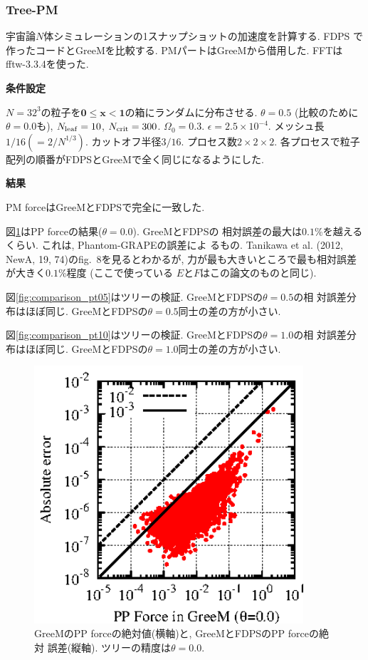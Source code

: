 \subsubsection{Tree-PM}

宇宙論$N$体シミュレーションの1スナップショットの加速度を計算する. FDPS
で作ったコードとGreeMを比較する. PMパートはGreeMから借用した. FFTは
fftw-3.3.4を使った.

{\bf 条件設定}

$N=32^3$の粒子を$\bm{0} \le \bm{x} < \bm{1}$の箱にランダムに分布させる.
$\theta=0.5$ (比較のために$\theta=0.0$も), $N_{\rm leaf}=10$, $N_{\rm
crit}=300$. $\Omega_0=0.3$. $\epsilon=2.5 \times 10^{-4}$. メッシュ長
$1/16(=2/N^{1/3})$. カットオフ半径$3/16$. プロセス数$2 \times 2 \times
2$. 各プロセスで粒子配列の順番がFDPSとGreeMで全く同じになるようにした.

{\bf 結果}

PM forceはGreeMとFDPSで完全に一致した.

図\ref{fig:comparison_pp}はPP forceの結果($\theta=0.0$). GreeMとFDPSの
相対誤差の最大は$0.1$\%を越えるくらい. これは, Phantom-GRAPEの誤差によ
るもの. Tanikawa et al. (2012, NewA, 19, 74)のfig.~8を見るとわかるが,
力が最も大きいところで最も相対誤差が大きく$0.1$\%程度 (ここで使っている
$E$と$F$はこの論文のものと同じ).

図\ref{fig:comparison_pt05}はツリーの検証. GreeMとFDPSの$\theta=0.5$の相
対誤差分布はほぼ同じ. GreeMとFDPSの$\theta=0.5$同士の差の方が小さい.

図\ref{fig:comparison_pt10}はツリーの検証. GreeMとFDPSの$\theta=1.0$の相
対誤差分布はほぼ同じ. GreeMとFDPSの$\theta=1.0$同士の差の方が小さい.

\begin{figure}
  \begin{center}
    \includegraphics[width=10cm,bb=0 0 170 170]{fig/comparison_pp.eps}
  \end{center}
  \caption{GreeMのPP forceの絶対値(横軸)と, GreeMとFDPSのPP forceの絶対
    誤差(縦軸). ツリーの精度は$\theta=0.0$.}
  \label{fig:comparison_pp}
\end{figure}

